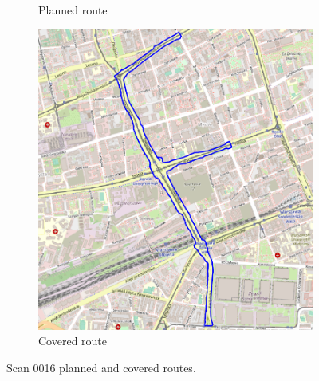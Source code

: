 \documentclass[a4paper,12pt]{book}
\begin{document}
\begin{enumerate}
\begin{figure}[H]
\begin{subfigure}{.63\textwidth}
			\caption{Planned route}
			\label{fig:a16}
		\end{subfigure}%
		\linebreak
		\begin{subfigure}{.63\textwidth}
			\centering
			\includegraphics[width=1\linewidth]{route_c16}
			\caption{Covered route}
			\label{fig:b16}
		\end{subfigure}
		\caption{Scan 0016 planned and covered routes.}
		\label{fig:fig16}
	\end{figure} 
\end{enumerate}
\end{document}
